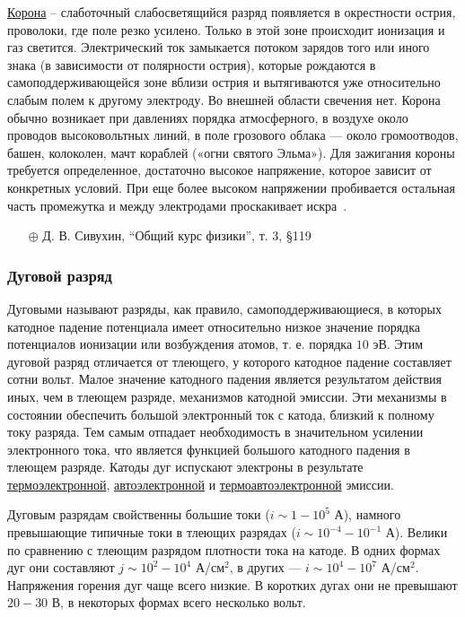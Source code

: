 \documentclass[10pt, a4paper]{article}
\begin{document}
\uline{Корона} -- слаботочный слабосветящийся разряд появляется в окрестности острия, проволоки, где поле резко усилено. Только в этой зоне происходит ионизация и газ светится. Электрический ток замыкается потоком зарядов того или иного знака (в зависимости от полярности острия), которые рождаются в самоподдерживающейся зоне вблизи острия и вытягиваются уже относительно слабым полем к другому электроду. Во внешней области свечения нет. Корона обычно возникает при давлениях порядка атмосферного, в воздухе около проводов высоковольтных линий, в поле грозового облака — около громоотводов, башен, колоколен, мачт кораблей («огни святого Эльма»). Для зажигания короны требуется определенное, достаточно высокое напряжение, которое зависит от конкретных условий. При еще более высоком напряжении пробивается остальная часть промежутка и между электродами проскакивает искра~\cite{raizer}.

\begin{itemize}
	\item[$\oplus$] Д. В. Сивухин, ``Общий курс физики'', т. 3, \S 119
\end{itemize}

\subsubsection{Дуговой разряд}

Дуговыми называют разряды, как правило, самоподдерживающиеся, в которых катодное падение потенциала имеет относительно низкое значение порядка потенциалов ионизации или возбуждения атомов, т. е. порядка $10$ эВ. Этим дуговой разряд отличается от тлеющего, у которого катодное падение составляет сотни вольт. Малое значение катодного падения является результатом действия иных, чем в тлеющем разряде, механизмов катодной эмиссии. Эти механизмы в состоянии обеспечить большой электронный ток с катода, близкий к полному току разряда. Тем самым отпадает необходимость в значительном усилении электронного тока, что является функцией большого катодного падения в тлеющем разряде. Катоды дуг испускают электроны в результате \uline{термоэлектронной}, \uline{автоэлектронной} и \uline{термоавтоэлектронной} эмиссии.

Дуговым разрядам свойственны большие токи ($i\sim1-10^5$ А), намного превышающие типичные токи в тлеющих разрядах ($i\sim10^{-4}-10^{-1}$ А). Велики по сравнению с тлеющим разрядом плотности тока на катоде. В одних формах дуг они составляют $j\sim10^2-10^4$ А/см$^2$, в других — $i\sim10^4-10^7$ А/см$^2$. Напряжения горения дуг чаще всего низкие. В коротких дугах они не превышают $20-30$ В, в некоторых формах всего несколько вольт.
\end{document}
